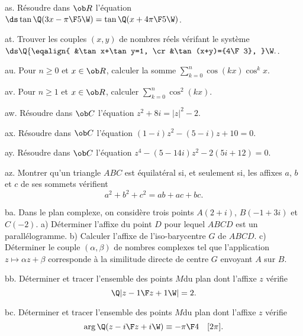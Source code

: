 \exo [Level=1,Fight=0,Learn=0,Field=\Trigonométrie,Type=\Colles,Origin=] as. 
Résoudre dans $\ob R$ l'équation $\ds\tan\Q(3x-{\pi\F5}\W)=\tan\Q(x+{4\pi\F5}\W)$. 

\exo [Level=1,Fight=1,Learn=1,Field=\NombresComplexes,Type=\Colles,Origin=] at. 
Trouver les couples $(x,y)$ de nombres réels vérifant le système $\ds\Q\{\eqalign{
&\tan x+\tan y=1,
\cr
&\tan(x+y)={4\F3},
}\W.$. 


\exo [Level=1,Fight=2,Learn=1,Field=\NombresComplexes,Type=\Exercices,Origin=] au. 
Pour $n\ge0$ et $x\in\ob R$, calculer la somme $\sum_{k=0}^n\cos(kx)\cos^kx$. 

\exo [Level=1,Fight=1,Learn=1,Field=\NombresComplexes,Type=\Colles,Origin=] av. 
Pour $n\ge1$ et $x\in\ob R$, calculer $\sum_{k=0}^n\cos^2(kx)$. 

\exo [Level=1,Fight=2,Learn=1,Field=\NombresComplexes,Type=\Colles,Origin=] aw. 
Résoudre dans $\ob C$ l'équation $z^2+8i=|z|^2-2$. 

\exo [Level=1,Fight=0,Learn=0,Field=\NombresComplexes,Type=\Cours,Origin=] ax. 
Résoudre dans $\ob C$ l'équation $(1-i)z^2-(5-i)z+10=0$. 

\exo [Level=1,Fight=1,Learn=0,Field=\NombresComplexes,Type=\Colles,Origin=] ay. 
Résoudre dans $\ob C$ l'équation $z^4-(5-14i)z^2-2(5i+12)=0$. 

\exo [Level=1,Fight=3,Learn=1,Field=\NombresComplexes|\GéométriePlane,Type=\Colles,Origin=] az. 
Montrer qu'un triangle $ABC$ est équilatéral si, et seulement si, les affixes $a$, $b$ et $c$ de ses sommets vérifient 
$$
a^2+b^2+c^2=ab+ac+bc. 
$$

\exo [Level=1,Fight=1,Learn=1,Field=\NombresComplexes|\GéométriePlane,Type=\Colles,Origin=] ba. 
Dans le plan complexe, on considère trois points $A(2+i)$, $B(-1+3i)$ et $C(-2)$. \pn
a) Déterminer l'affixe du point $D$ pour lequel $ABCD$ est un parallélogramme. \pn
b) Calculer l'affixe de l'iso-barycentre $G$ de $ABCD$. \pn
c) Déterminer le couple $(\alpha,\beta)$ de nombres complexes tel que l'application $z\mapsto\alpha z+\beta$ 
corresponde à la similitude directe de centre $G$ envoyant $A$ sur $B$. 

\exo [Level=1,Fight=0,Learn=0,Field=\NombresComplexes|\GéométriePlane,Type=\Exercices,Origin=] bb. 
Déterminer et tracer l'ensemble des points $M$du plan dont l'affixe $z$ vérifie
$$
\Q|{z-1\F z+1}\W|=2.
$$

\exo [Level=1,Fight=1,Learn=0,Field=\NombresComplexes|\GéométriePlane,Type=\Exercices,Origin=] bc. 
Déterminer et tracer l'ensemble des points $M$du plan dont l'affixe $z$ vérifie
$$
\arg\Q({z-i\F z+i}\W)\equiv-{\pi\F4}\quad[2\pi].
$$

